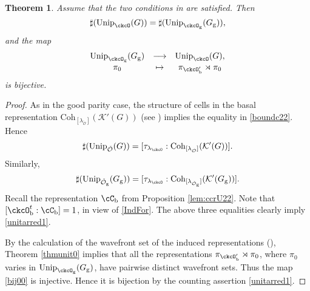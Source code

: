 \documentclass[12pt,a4paper]{amsart}
\newcommand{\CK}{{\mathcal {K}}}
\newcommand{\CO}{{\mathcal {O}}}
\newcommand{\be}{\begin {equation}}
\newcommand{\ee}{\end {equation}}
\numberwithin{equation}{section}
\newtheorem{thm}{Theorem}[section]
\theoremstyle{remark}
\def\Unip{\mathrm{Unip}}
\def\lamck{\lambda_\ckcO}
\def\Coh{\mathrm{Coh}}
\def\ckcOpb{\ckcO'_{\mathrm b}}
\def\ckcOg{\ckcO_{\mathrm g}}
\def\Gg{G_{\mathrm g}}
\begin{document}
\begin{thm}
  Assume that the two conditions in  are satisfied.
  Then
  \begin{equation}\label{unitarred1}
    \sharp(\Unip_{\ckcO}(G)) =
    \sharp(\Unip_{\ckcO_{\mathrm g}}(\Gg)),
  \end{equation}
  and the map
  \begin{equation}
  \label{bij00}
    \begin{array}{ccc}
      \Unip_{\ckcOg}(\Gg)&\longrightarrow &\Unip_{\ckcO}(G),\\
      \pi_{0}& \mapsto & \pi_{\ckcOpb}\rtimes \pi_{0} \\
    \end{array}
  \end{equation}
  is bijective. %
\end{thm}

\begin{proof}
 As in the good parity case,  the structure of cells in the basal representation
  $\Coh_{[\lambda_{\check \CO}]}(\CK'(G))$ (see \cite[Theorem 5]{Bo}) implies
  the equality in \eqref{boundc22}. Hence
  \[
    \sharp(\Unip_{\check \CO}(G)) =[\tau_{\lamck}: \Coh_{[\lambda_{\check \CO}]}(\CK'(G))].
  \]
  Similarly,
  \[
    \sharp(\Unip_{\check \CO_\mathrm g}(G_\mathrm g)) = [\tau_{\lamck}: \Coh_{[\lambda_{\check \CO_\mathrm g}]}(\CK'(G_\mathrm g))].
  \]
 Recall the representation $\cC_\mathrm b$ from Proposition \ref{lem:ccrU22}.   Note that $[\ckcO_{\mathrm b}^{t}:\cC_{\mathrm b}]=1$, in view of
  \eqref{IndFor}. The above three equalities clearly imply \eqref{unitarred1}.

 By the  calculation of  the wavefront set of the induced representations (\cite[Corollary 5.0.10]{B.Orbit}),  Theorem \ref{thmunit0} implies that all the representations $\pi_{\ckcOpb}\rtimes \pi_{0}$, where $\pi_0$ varies in $\Unip_{\ckcO_{\mathrm g}}(\Gg)$, have pairwise distinct wavefront sets.   Thus the map \eqref{bij00} is injective. Hence it is bijection by the counting assertion \eqref{unitarred1}.
\end{proof}
\end{document}
